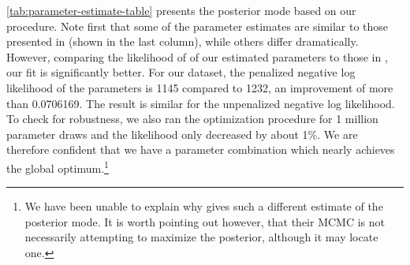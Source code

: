 \documentclass[11pt]{article}
\begin{document}
\autoref{tab:parameter-estimate-table} presents the posterior mode based
on our procedure. Note first that some of the parameter estimates are
similar to those presented in \citep{SmetsWouters2007} (shown in the
last column), while others differ dramatically. However, comparing the
likelihood of of our estimated parameters to those in
\citep{SmetsWouters2007}, our fit is significantly better. For our
dataset, the penalized negative log likelihood of the parameters is 1145
compared to 1232, an improvement of more than 0.0706169. The result is
similar for the unpenalized negative log likelihood. To check for
robustness, we also ran the optimization procedure for 1 million
parameter draws and the likelihood only decreased by about 1\%. We are
therefore confident that we have a parameter combination which nearly
achieves the global optimum.\footnote{We have been
  unable to explain why \citet{SmetsWouters2007} gives such a different
  estimate of the posterior mode. It is worth pointing out however, that their
  MCMC is not necessarily attempting to maximize the posterior, although it may
  locate one.}
\end{document}
